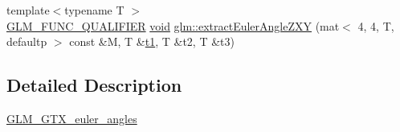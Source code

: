 \begin{DoxyCompactItemize}
\item 
{\footnotesize template$<$typename T $>$ }\\\mbox{\hyperlink{setup_8hpp_a33fdea6f91c5f834105f7415e2a64407}{G\+L\+M\+\_\+\+F\+U\+N\+C\+\_\+\+Q\+U\+A\+L\+I\+F\+I\+ER}} \mbox{\hyperlink{_s_d_l__opengles2__gl2ext_8h_ae5d8fa23ad07c48bb609509eae494c95}{void}} \mbox{\hyperlink{group__gtx__euler__angles_ga81fbbca2ba0c778b9662d5355b4e2363}{glm\+::extract\+Euler\+Angle\+Z\+XY}} (mat$<$ 4, 4, T, defaultp $>$ const \&M, T \&\mbox{\hyperlink{_s_d_l__opengl__glext_8h_af48031a37b713afa3b0d0d7d29653d7c}{t1}}, T \&t2, T \&t3)
\end{DoxyCompactItemize}


\subsection{Detailed Description}
\mbox{\hyperlink{group__gtx__euler__angles}{G\+L\+M\+\_\+\+G\+T\+X\+\_\+euler\+\_\+angles}} 